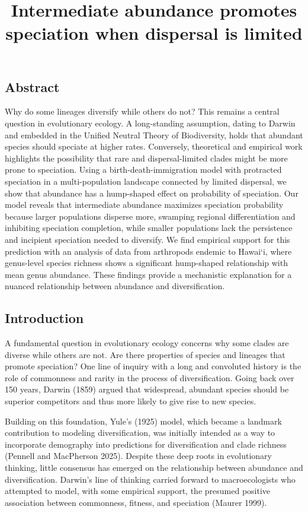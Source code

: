 \documentclass[
  letterpaper,
  DIV=11,
  numbers=noendperiod]{scrartcl}
\title{Intermediate abundance promotes speciation when dispersal is
limited}
\author{}
\date{}
\begin{document}
\maketitle


\linenumbers

\subsection{Abstract}\label{abstract}

Why do some lineages diversify while others do not? This remains a
central question in evolutionary ecology. A long-standing assumption,
dating to Darwin and embedded in the Unified Neutral Theory of
Biodiversity, holds that abundant species should speciate at higher
rates. Conversely, theoretical and empirical work highlights the
possibility that rare and dispersal-limited clades might be more prone
to speciation. Using a birth-death-immigration model with protracted
speciation in a multi-population landscape connected by limited
dispersal, we show that abundance has a hump-shaped effect on
probability of speciation. Our model reveals that intermediate abundance
maximizes speciation probability because larger populations disperse
more, swamping regional differentiation and inhibiting speciation
completion, while smaller populations lack the persistence and incipient
speciation needed to diversify. We find empirical support for this
prediction with an analysis of data from arthropods endemic to Hawai`i,
where genus-level species richness shows a significant hump-shaped
relationship with mean genus abundance. These findings provide a
mechanistic explanation for a nuanced relationship between abundance and
diversification.

\pagebreak

\subsection{Introduction}\label{introduction}

A fundamental question in evolutionary ecology concerns why some clades
are diverse while others are not. Are there properties of species and
lineages that promote speciation? One line of inquiry with a long and
convoluted history is the role of commonness and rarity in the process
of diversification. Going back over 150 years, Darwin (1859) argued that
widespread, abundant species should be superior competitors and thus
more likely to give rise to new species.

Building on this foundation, Yule's (1925) model, which became a
landmark contribution to modeling diversification, was initially
intended as a way to incorporate demography into predictions for
diversification and clade richness (Pennell and MacPherson 2025).
Despite these deep roots in evolutionary thinking, little consensus has
emerged on the relationship between abundance and diversification.
Darwin's line of thinking carried forward to macroecologists who
attempted to model, with some empirical support, the presumed positive
association between commonness, fitness, and speciation (Maurer 1999).
\end{document}
